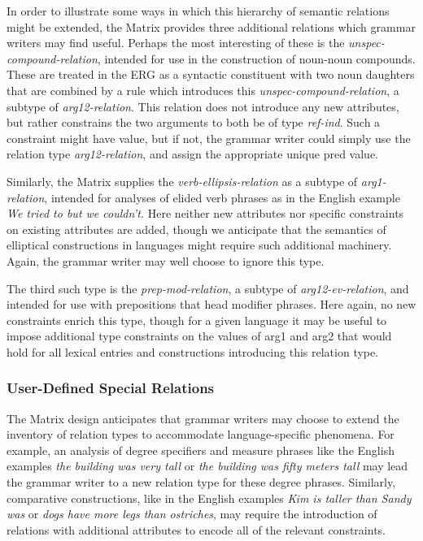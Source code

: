\documentclass[12pt]{article}
\begin{document}
{In order to illustrate some ways in which this hierarchy of semantic relations
might be extended, the Matrix provides three additional relations which 
grammar writers may find useful.  Perhaps the most interesting of these is
the {\it unspec-compound-relation}, intended for use in the construction of
noun-noun compounds.  These are treated in the ERG as a syntactic constituent 
with two noun daughters that are combined by a rule which introduces this
{\it unspec-compound-relation}, a subtype of {\it arg12-relation}.  This
relation does not introduce any new attributes, but rather constrains the
two arguments to both be of type {\it ref-ind}.  Such a constraint might have
value, but if not, the grammar writer could simply use the relation type
{\it arg12-relation}, and assign the appropriate unique {\sc pred} value.

Similarly, the Matrix supplies the {\it verb-ellipsis-relation} as a subtype of
{\it arg1-relation}, intended for analyses of elided verb phrases as in the
English example {\it We tried to but we couldn't.}  Here neither new attributes
nor specific constraints on existing attributes are added, though we 
anticipate that the semantics of elliptical constructions in languages might
require such additional machinery.  Again, the grammar writer may well choose
to ignore this type.

The third such type is the {\it prep-mod-relation}, a subtype of 
{\it arg12-ev-relation}, and intended for use with prepositions that head
modifier phrases.  Here again, no new constraints enrich this type, though
for a given language it may be useful to impose additional type constraints
on the values of {\sc arg1} and {\sc arg2} that would hold for all lexical
entries and constructions introducing this relation type.  

\subsubsection{User-Defined Special Relations}

The Matrix design anticipates that grammar writers may choose to extend the
inventory of relation types to accommodate language-specific phenomena.  For
example, an analysis of degree specifiers and measure phrases like the 
English examples {\it the building was very tall} or {\it the building was 
fifty meters tall} may lead the grammar writer to a new relation type for
these degree phrases.  Similarly, comparative constructions, like in the 
English examples {\it Kim is taller than Sandy was} or {\it dogs have more
legs than ostriches}, may require the introduction of relations with 
additional attributes to encode all of the relevant constraints.  

}
\end{document}
